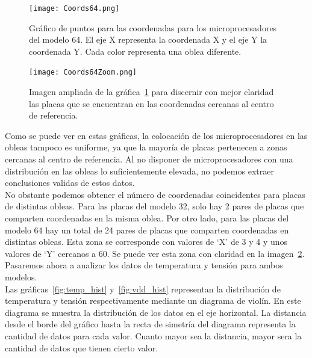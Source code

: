 \documentclass[spanish]{template/minim}
\begin{document}
\begin{fullwidth}
\begin{figure}[H]
    \centering
    \texttt{[image: Coords64.png]}
    \caption[Coordenadas para el modelo 64]{
        Gráfico de puntos para las coordenadas para los microprocesadores del modelo 64. El eje X representa la coordenada X y el eje Y la coordenada Y. Cada color representa una oblea diferente.\label{fig:coords_64}
    }
\end{figure}
\end{fullwidth}

\begin{fullwidth}
\begin{figure}[H]
    \centering
    \texttt{[image: Coords64Zoom.png]}
    \caption[Ampliación del gráfico~\ref{fig:coords_64}]{
        Imagen ampliada de la gráfica~\ref{fig:coords_64} para discernir con mejor claridad las placas que se encuentran en las coordenadas cercanas al centro de referencia.\label{fig:coords_64_zoom}
    }
\end{figure}
\end{fullwidth}

Como se puede ver en estas gráficas, la colocación de los microprocesadores en las obleas tampoco es uniforme, ya que la mayoría de placas pertenecen a zonas cercanas al centro de referencia. Al no disponer de microprocesadores con una distribución en las obleas lo suficientemente elevada, no podemos extraer conclusiones validas de estos datos.\\

No obstante podemos obtener el número de coordenadas coincidentes para placas de distintas obleas. Para las placas del modelo 32, solo hay 2 pares de placas que comparten coordenadas en la misma oblea. Por otro lado, para las placas del modelo 64 hay un total de 24 pares de placas que comparten coordenadas en distintas obleas. Esta zona se corresponde con valores de `X' de 3 y 4 y unos valores de `Y' cercanos a 60. Se puede ver esta zona con claridad en la imagen~\ref{fig:coords_64_zoom}.\\

Pasaremos ahora a analizar los datos de temperatura y tensión para ambos modelos.\\

Las gráficas~\ref{fig:temp_hist} y~\ref{fig:vdd_hist} representan la distribución de temperatura y tensión respectivamente mediante un diagrama de violín. En este diagrama se muestra la distribución de los datos en el eje horizontal. La distancia desde el borde del gráfico hasta la recta de simetría del diagrama representa la cantidad de datos para cada valor. Cuanto mayor sea la distancia, mayor sera la cantidad de datos que tienen cierto valor.\\
\end{document}
